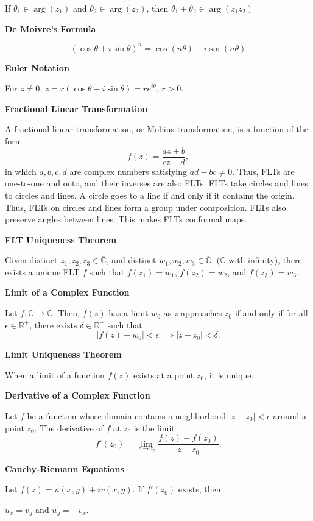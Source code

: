 \documentclass{article}
\newcommand{\R}{\mathbb R}
\newcommand{\C}{\mathbb C}
\begin{document}
    If $\theta_1 \in \arg(z_1)$ and $\theta_2 \in \arg(z_2)$, then $\theta_1 + \theta_2 \in \arg(z_1z_2)$

\medskip\noindent\textbf{De Moivre's Formula}

    $$(\cos\theta + i\sin\theta)^n = \cos(n\theta) + i\sin(n\theta)$$

\medskip\noindent\textbf{Euler Notation}

    For $z \neq 0$, $z = r(\cos\theta + i\sin\theta) = re^{i\theta}$, $r > 0$.

\medskip\noindent\textbf{Fractional Linear Transformation}

    A fractional linear transformation, or Mobius transformation, is a function of the form $$f(z) = \frac{az+b}{cz+d},$$ in which $a,b,c,d$ are complex numbers satisfying $ad-bc \neq 0$.
    Thus, FLTs are one-to-one and onto, and their inverses are also FLTs.
    FLTs take circles and lines to circles and lines. A circle goes to a line if and only if it contains the origin.
    Thus, FLTs on circles and lines form a group under composition.
    FLTs also preserve angles between lines. This makes FLTs conformal maps.

\medskip\noindent\textbf{FLT Uniqueness Theorem}

    Given distinct $z_1, z_2, z_3 \in \overline{\mathbb C}$, and distinct $w_1, w_2, w_3 \in \overline{\mathbb C}$, ($\mathbb C$ with infinity), there exists a unique FLT $f$ such that $f(z_1) = w_1$, $f(z_2) = w_2$, and $f(z_3) = w_3$.

\medskip\noindent\textbf{Limit of a Complex Function}

	Let $f: \C \to \C$. Then, $f(z)$ has a limit $w_0$ as $z$ approaches $z_0$ if and only if for all $\epsilon \in \R^+$, there exists $\delta \in \R^+$ such that $$|f(z) - w_0| < \epsilon \implies |z - z_0| < \delta.$$

\medskip\noindent\textbf{Limit Uniqueness Theorem}

	When a limit of a function $f(z)$ exists at a point $z_0$, it is unique.

\medskip\noindent\textbf{Derivative of a Complex Function}

	Let $f$ be a function whose domain contains a neighborhood $|z-z_0| < \epsilon$ around a point $z_0$.
	The derivative of $f$ at $z_0$ is the limit $$f'(z_0) = \lim_{z\to z_0}\frac{f(z)-f(z_0)}{z-z_0}.$$

\medskip\noindent\textbf{Cauchy-Riemann Equations}

	Let $f(z) = u(x,y) + iv(x,y).$
	If $f'(z_0)$ exists, then \begin{center}$u_x = v_y$ and $u_y = -v_x.$\end{center}
\end{document}
